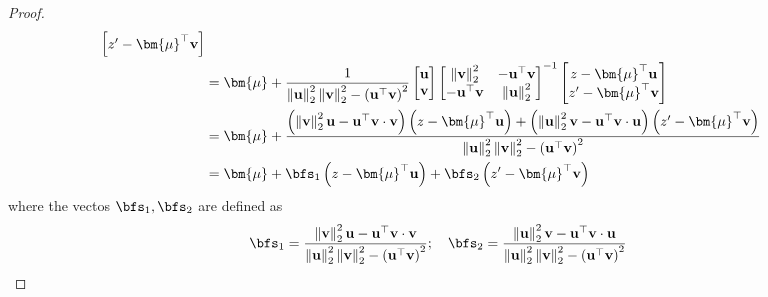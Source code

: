 \documentclass[10pt]{article} %
\theoremstyle{definition}
\theoremstyle{plain}
\newcommand{\paren}[1]{\left(#1\right)}
\newcommand{\norm}[1]{\left\|#1\right\|}
\def\bfu{{\mathbf{u}}}\def\bfv{{\mathbf{v}}}\def\bfw{{\mathbf{w}}}\def\bfx{{\mathbf{x}}}
\begin{document}
\begin{proof}
\begin{align*}
\begin{bmatrix}
            z'-\bm{\mu}^\top\bfv
        \end{bmatrix}\\
        & = \bm{\mu} + \frac{1}{\norm{\bfu}_2^2\norm{\bfv}_2^2 - \paren{\bfu^\top\bfv}^2}\begin{bmatrix}
            \bfu\\
            \bfv
        \end{bmatrix}\begin{bmatrix}
            \norm{\bfv}_2^2 & -\bfu^\top\bfv\\
            -\bfu^\top\bfv& \norm{\bfu}_2^2 
        \end{bmatrix}^{-1}\begin{bmatrix}
            z - \bm{\mu}^\top\bfu\\
            z'-\bm{\mu}^\top\bfv
        \end{bmatrix}\\
        & = \bm{\mu} + \frac{\paren{\norm{\bfv}_2^2\bfu - \bfu^\top\bfv\cdot \bfv}\paren{z - \bm{\mu}^\top\bfu} + \paren{\norm{\bfu}_2^2\bfv - \bfu^\top\bfv\cdot \bfu}\paren{z' -\bm{\mu}^\top\bfv}}{\norm{\bfu}_2^2\norm{\bfv}_2^2 - \paren{\bfu^\top\bfv}^2}\\
        & = \bm{\mu} + \bfs_1\paren{z - \bm{\mu}^\top\bfu} + \bfs_2\paren{z'- \bm{\mu}^\top\bfv}
    \end{align*}where the vectos $\bfs_1,\bfs_2$ are defined as
    \[
        \bfs_1 = \frac{\norm{\bfv}_2^2\bfu - \bfu^\top\bfv\cdot\bfv}{\norm{\bfu}_2^2\norm{\bfv}_2^2 - \paren{\bfu^\top\bfv}^2};\quad \bfs_2 = \frac{\norm{\bfu}_2^2\bfv - \bfu^\top\bfv\cdot\bfu}{\norm{\bfu}_2^2\norm{\bfv}_2^2 - \paren{\bfu^\top\bfv}^2}
    \]
\end{proof}
\end{document}
